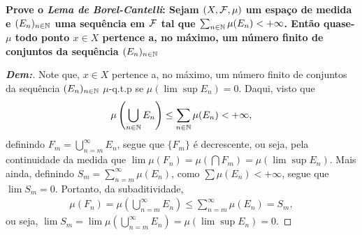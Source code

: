 \newpage 
{}
\myexe{\thedois}
\bigline 
\textbf{Prove o \textit{Lema de Borel-Cantelli}: Sejam $(X, \mathcal F, \mu)$ um espaço 
de medida e $(E_n)_{n \in \mathbb N}$ uma sequência em $\mathcal F$ tal que 
$\sum_{n \in \mathbb N} \mu(E_n) < +\infty$. Então quase-$\mu$ todo ponto $x \in X$ pertence a, 
no máximo, um número finito de conjuntos da sequência $(E_n)_{n \in \mathbb N}$}
\begin{proof}[\textbf{Dem:}] Note que, $x\in X$ pertence a, no máximo, um número 
  finito de conjuntos da sequência $(E_n)_{n \in \mathbb N}$ $\mu$-q.t.p se 
  $\mu(\lim\sup E_n) = 0$. Daqui, visto que 
  \begin{align*}
    \mu\left(\bigcup\limits_{n \in \mathbb N}
    E_n\right) \le \sum_{n \in \mathbb N} \mu(E_n) < +\infty,
  \end{align*}
  definindo $F_m = \bigcup_{n = m}^\infty E_n$, 
  segue que $\{F_m\}$ é decrescente, ou seja, 
  pela continuidade da medida que $\lim \mu (F_n) = \mu(\bigcap F_m) = \mu(\lim\sup E_n)$. 
  Mais ainda, definindo $S_m = \sum_{n = m}^\infty \mu(E_n)$, como $\sum \mu(E_n) < +\infty$,
  segue que $\lim S_m = 0$. Portanto, da subaditividade, 
  \begin{align*}
    \mu(F_n) = \mu\left(\bigcup\limits_{n = m}^\infty E_n\right)
    \le \sum_{n = m}^\infty \mu(E_n) = S_m,
  \end{align*}
  ou seja, $\lim S_m = \lim \mu\left(\bigcup\limits_{n = m}^\infty E_n\right) 
  = \mu(\lim\sup E_n) = 0$.
\end{proof}
\biglinend

